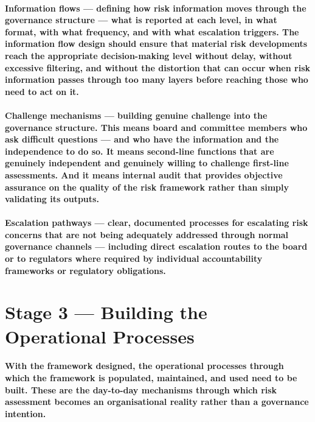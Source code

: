 \paragraph{\textbf{Information flows} — defining how risk information moves through the governance structure — what is reported at each level, in what format, with what frequency, and with what escalation triggers. The information flow design should ensure that material risk developments reach the appropriate decision-making level without delay, without excessive filtering, and without the distortion that can occur when risk information passes through too many layers before reaching those who need to act on it.}
\paragraph{\textbf{Challenge mechanisms} — building genuine challenge into the governance structure. This means board and committee members who ask difficult questions — and who have the information and the independence to do so. It means second-line functions that are genuinely independent and genuinely willing to challenge first-line assessments. And it means internal audit that provides objective assurance on the quality of the risk framework rather than simply validating its outputs.}
\paragraph{\textbf{Escalation pathways} — clear, documented processes for escalating risk concerns that are not being adequately addressed through normal governance channels — including direct escalation routes to the board or to regulators where required by individual accountability frameworks or regulatory obligations.}

\section{Stage 3 — Building the Operational Processes}
\paragraph{With the framework designed, the operational processes through which the framework is populated, maintained, and used need to be built. These are the day-to-day mechanisms through which risk assessment becomes an organisational reality rather than a governance intention.}

